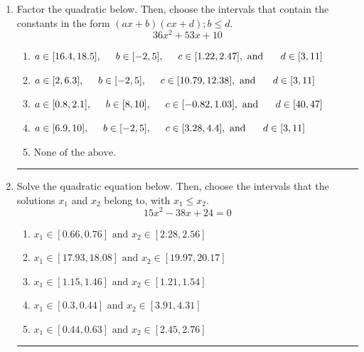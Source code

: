 \documentclass[14pt]{extbook}
\newcommand{\litem}[1]{\item#1\hspace*{-1cm}\rule{\textwidth}{0.4pt}}
\begin{document}
\begin{enumerate}
{\begin{enumerate}[label=\Alph*.]
\end{enumerate} }
\litem{
Factor the quadratic below. Then, choose the intervals that contain the constants in the form $(ax+b)(cx+d); b \leq d.$\[ 36x^{2} +53 x + 10 \]\begin{enumerate}[label=\Alph*.]
\item \( a \in [16.4, 18.5], \hspace*{5mm} b \in [-2, 5], \hspace*{5mm} c \in [1.22, 2.47], \text{ and } \hspace*{5mm} d \in [3, 11] \)
\item \( a \in [2, 6.3], \hspace*{5mm} b \in [-2, 5], \hspace*{5mm} c \in [10.79, 12.38], \text{ and } \hspace*{5mm} d \in [3, 11] \)
\item \( a \in [0.8, 2.1], \hspace*{5mm} b \in [8, 10], \hspace*{5mm} c \in [-0.82, 1.03], \text{ and } \hspace*{5mm} d \in [40, 47] \)
\item \( a \in [6.9, 10], \hspace*{5mm} b \in [-2, 5], \hspace*{5mm} c \in [3.28, 4.4], \text{ and } \hspace*{5mm} d \in [3, 11] \)
\item \( \text{None of the above.} \)

\end{enumerate} }
\litem{
Solve the quadratic equation below. Then, choose the intervals that the solutions $x_1$ and $x_2$ belong to, with $x_1 \leq x_2$.\[ 15x^{2} -38 x + 24 = 0 \]\begin{enumerate}[label=\Alph*.]
\item \( x_1 \in [0.66, 0.76] \text{ and } x_2 \in [2.28, 2.56] \)
\item \( x_1 \in [17.93, 18.08] \text{ and } x_2 \in [19.97, 20.17] \)
\item \( x_1 \in [1.15, 1.46] \text{ and } x_2 \in [1.21, 1.54] \)
\item \( x_1 \in [0.3, 0.44] \text{ and } x_2 \in [3.91, 4.31] \)
\item \( x_1 \in [0.44, 0.63] \text{ and } x_2 \in [2.45, 2.76] \)


\end{enumerate}}
\end{enumerate}
\end{document}
